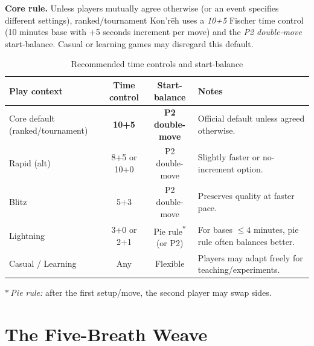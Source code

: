 \documentclass[11pt]{article}
\renewcommand{\arraystretch}{1.15}
\begin{document}
\noindent\textbf{Core rule.} Unless players mutually agree otherwise (or an event specifies different settings), ranked/tournament Kon’rēh uses a \emph{10+5} Fischer time control (10 minutes base with +5 seconds increment per move) and the \emph{P2 double-move} start-balance. Casual or learning games may disregard this default.

\begin{table}[h!]
\centering
\caption{Recommended time controls and start-balance}
\label{tab:time_controls}
\renewcommand{\arraystretch}{1.2}
\begin{tabular}{l c c l}
\hline
\textbf{Play context} & \textbf{Time control} & \textbf{Start-balance} & \textbf{Notes} \\
\hline
Core default (ranked/tournament) & \textbf{10+5} & \textbf{P2 double-move} & Official default unless agreed otherwise. \\
Rapid (alt) & 8+5 or 10+0 & P2 double-move & Slightly faster or no-increment option. \\
Blitz & 5+3 & P2 double-move & Preserves quality at faster pace. \\
Lightning & 3+0 or 2+1 & Pie rule\textsuperscript{$\ast$} (or P2) & For bases $\leq 4$ minutes, pie rule often balances better. \\
Casual / Learning & Any & Flexible & Players may adapt freely for teaching/experiments. \\
\hline
\end{tabular}

\vspace{4pt}
\footnotesize $\ast$\,\textit{Pie rule:} after the first setup/move, the second player may swap sides.
\end{table}

\clearpage
\section{The Five-Breath Weave}
\label{sec:five-breath-weave}
\end{document}
